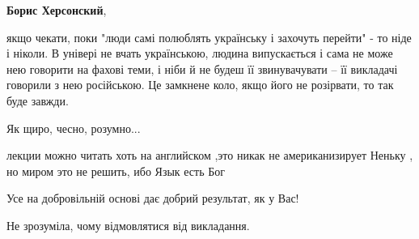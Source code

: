 \begin{itemize}
\begin{itemize}
 
\textbf{Борис Херсонский}, 

якщо чекати, поки "люди самі полюблять українську і захочуть перейти" - то ніде
і ніколи. В універі не вчать українською, людина випускається і сама не може
нею говорити на фахові теми, і ніби й не будеш її звинувачувати -- її викладачі
говорили з нею російською. Це замкнене коло, якщо його не розірвати, то так
буде завжди.
\end{itemize}

 
Як щиро, чесно, розумно...

 

лекции можно читать хоть на английском ,это никак не американизирует Неньку ,
но миром это не решить, ибо Язык есть Бог


 
Усе на добровільній основі дає добрий результат, як у Вас!

 
Не зрозуміла, чому відмовлятися від викладання.

 


\end{itemize}
